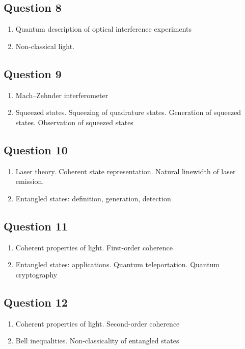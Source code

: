 \documentclass[12pt,a4paper]{article}
\begin{document}
\subsection*{Question 8} 
\begin{enumerate}
\item Quantum description of optical interference experiments
\item Non-classical light.
\end{enumerate}

\subsection*{Question 9} 
\begin{enumerate}
\item Mach–Zehnder interferometer
\item Squeezed states. Squeezing of quadrature states. Generation
  of squeezed states. Observation of squeezed states
\end{enumerate}

\subsection*{Question 10} 
\begin{enumerate}
\item Laser theory. Coherent state representation. Natural
  linewidth of laser emission.
\item Entangled states: definition, generation, detection
\end{enumerate}

\subsection*{Question 11} 
\begin{enumerate}
\item Coherent properties of light. First-order coherence
\item Entangled states: applications. Quantum
  teleportation. Quantum cryptography
\end{enumerate}

\subsection*{Question 12} 
\begin{enumerate}
\item Coherent properties of light. Second-order coherence
\item Bell inequalities. Non-classicality of entangled states
\end{enumerate}
\end{document}
